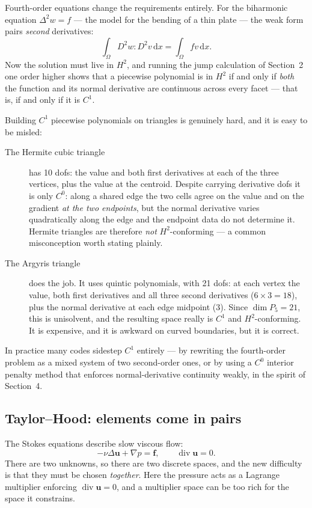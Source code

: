 \documentclass[11pt,a4paper]{article}
\newcommand{\dv}{\operatorname{div}}
\newcommand{\dx}{\,\mathrm{d}x}
\newcommand{\bu}{\mathbf{u}}
\begin{document}
Fourth-order equations change the requirements entirely. For the biharmonic
equation $\Delta^2 w = f$ --- the model for the bending of a thin plate --- the
weak form pairs \emph{second} derivatives:
\[
  \int_\Omega D^2 w : D^2 v \dx = \int_\Omega f v \dx .
\]
Now the solution must live in $H^2$, and running the jump calculation of
Section~2 one order higher shows that a piecewise polynomial is in $H^2$ if and
only if \emph{both} the function and its normal derivative are continuous across
every facet --- that is, if and only if it is $C^1$.

Building $C^1$ piecewise polynomials on triangles is genuinely hard, and it is
easy to be misled:

\begin{description}
\item[The Hermite cubic triangle] has 10 dofs: the value and both first
  derivatives at each of the three vertices, plus the value at the centroid.
  Despite carrying derivative dofs it is only $C^0$: along a shared edge the two
  cells agree on the value and on the gradient \emph{at the two endpoints}, but
  the normal derivative varies quadratically along the edge and the endpoint
  data do not determine it. Hermite triangles are therefore \emph{not}
  $H^2$-conforming --- a common misconception worth stating plainly.
\item[The Argyris triangle] does the job. It uses quintic polynomials, with 21
  dofs: at each vertex the value, both first derivatives and all three second
  derivatives ($6 \times 3 = 18$), plus the normal derivative at each edge
  midpoint ($3$). Since $\dim P_5 = 21$, this is unisolvent, and the resulting
  space really is $C^1$ and $H^2$-conforming. It is expensive, and it is
  awkward on curved boundaries, but it is correct.
\end{description}

In practice many codes sidestep $C^1$ entirely --- by rewriting the fourth-order
problem as a mixed system of two second-order ones, or by using a $C^0$ interior
penalty method that enforces normal-derivative continuity weakly, in the spirit
of Section~4.

\subsection{Taylor--Hood: elements come in pairs}
\label{sec:taylorhood}

The Stokes equations describe slow viscous flow:
\[
  -\nu \Delta \bu + \nabla p = \mathbf{f}, \qquad \dv \bu = 0 .
\]
There are two unknowns, so there are two discrete spaces, and the new
difficulty is that they must be chosen \emph{together}. Here the pressure acts
as a Lagrange multiplier enforcing $\dv\bu = 0$, and a multiplier space can be
too rich for the space it constrains.
\end{document}
